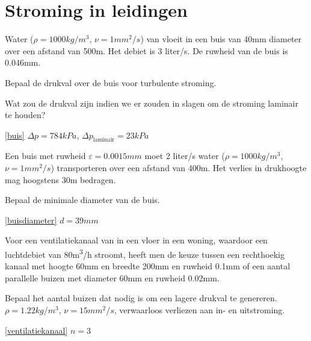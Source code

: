 \chapter{Stroming in leidingen}
\label{sec:Stroming in leidingen}
\begin{toepassing}
	\label{buis}
Water ($\rho=1000\unit{kg/m^3}$, $\nu=1\unit{mm^2/s}$) van vloeit in een buis van \unit{40}{mm} diameter over een afstand van 500m. Het debiet is 3 liter/s.  De ruwheid van de buis is 0.046mm.
		
Bepaal de drukval over de buis voor turbulente stroming.
		
Wat zou de drukval zijn indien we er zouden in slagen om de stroming laminair te houden?
\end{toepassing}
\begin{antwoord}{\ref{buis}}
	$\Delta p = 784\unit{kPa}$, $\Delta p_{\text{laminair}} = 23\unit{kPa}$
\end{antwoord}
\begin{toepassing}[*]
	\label{buisdiameter}
Een buis met ruwheid $\varepsilon = 0.0015\unit{mm}$ moet 2 liter/s water ($\rho=1000\unit{kg/m^3}$, $\nu=1\unit{mm^2/s}$) transporteren over een afstand van 400m.  Het verlies in drukhoogte mag hoogstens 30m bedragen.
		
Bepaal de minimale diameter van de buis.
\end{toepassing}
\begin{antwoord}{\ref{buisdiameter}}
	$d = 39\unit{mm}$
\end{antwoord}
\begin{toepassing}
	\label{ventilatiekanaal}
Voor een ventilatiekanaal van in een vloer in een woning, waardoor een luchtdebiet van 80\unit{m^3/h} stroomt, heeft men de keuze tussen een rechthoekig kanaal met hoogte 60mm en breedte 200mm en ruwheid 0.1mm of een aantal parallelle buizen met diameter 60mm en ruwheid 0.02mm. 
		
Bepaal het aantal buizen dat nodig is om een lagere drukval te genereren. $\rho = 1.22\unit{kg/m^3}$, $\nu = 15\unit{mm^2/s}$, verwaarloos verliezen aan in- en uitstroming.
\end{toepassing}
\begin{antwoord}{\ref{ventilatiekanaal}}
	$n = 3$
\end{antwoord}
